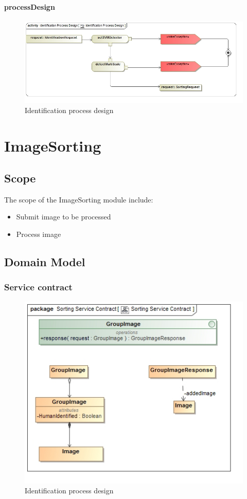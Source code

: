 \documentclass[a4paper,12pt]{report}
\begin{document}
			\paragraph {processDesign}
				\begin{figure}[htb]
					\centering
					\includegraphics [scale=0.5]{../Diagrams/Identification_Process_Design.jpg}
					\caption{Identification process design}
				\end{figure}	

\section {ImageSorting}
		\FloatBarrier	
		\subsection {Scope}
		The scope of the ImageSorting module include:
			\begin {itemize}
				\item Submit image to be processed
				\item Process image
			\end {itemize}
	
	\FloatBarrier		
	\subsection {Domain Model}
		\FloatBarrier	
		\subsubsection {Service contract}		
		\begin{figure}[htb]
			\centering
			\includegraphics [scale=0.5]{../Diagrams/Sorting_Service_Contract.jpg}
			\caption{Identification process design}
		\end{figure}
		
\end{document}

